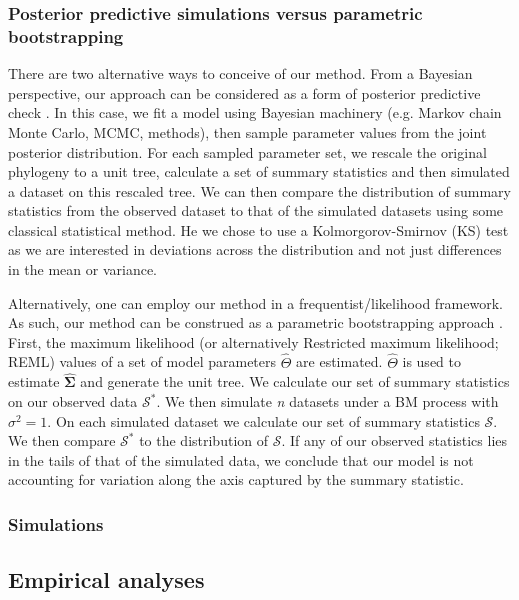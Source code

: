 \documentclass[12pt]{article}
\begin{document}
\subsubsection{Posterior predictive simulations versus parametric bootstrapping}
There are two alternative ways to conceive of our method. From a Bayesian perspective, our approach can be considered as a form of posterior predictive check \citep{Rubin1984, Gelman1996, Gelman2003}. In this case, we fit a model using Bayesian machinery (e.g. Markov chain Monte Carlo, MCMC, methods), then sample parameter values from the joint posterior distribution. For each sampled parameter set, we rescale the original phylogeny to a unit tree, calculate a set of summary statistics and then simulated a dataset on this rescaled tree. We can then compare the distribution of summary statistics from the observed dataset to that of the simulated datasets using some classical statistical method. He we chose to use a Kolmorgorov-Smirnov (KS) test \citep{ks} as we are interested in deviations across the distribution and not just differences in the mean or variance.


Alternatively, one can employ our method in a frequentist/likelihood framework. As such, our method can be construed as a parametric bootstrapping approach \citep{Efronbootstrap}. First, the maximum likelihood (or alternatively Restricted maximum likelihood; REML) values of a set of model parameters $\hat{\Theta}$ are estimated. $\hat{\Theta}$ is used to estimate $\hat{\mathbf{\Sigma}}$ and generate the unit tree. We calculate our set of summary statistics on our observed data $\mathcal{S}^*$. We then simulate \textit{n} datasets under a BM process with $\sigma^2 = 1$. On each simulated dataset we calculate our set of summary statistics $\mathcal{S}$. We then compare $\mathcal{S}^*$ to the distribution of $\mathcal{S}$. If any of our observed statistics lies in the tails of that of the simulated data, we conclude that our model is not accounting for variation along the axis captured by the summary statistic. 



\subsubsection{Simulations}


\subsection{Empirical analyses}
\end{document}
